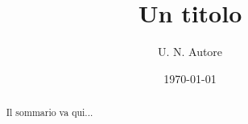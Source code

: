 \documentclass{article}
\title{Un titolo}
\author{U. N. Autore}
\date{\today}
\begin{document}
\maketitle

\begin{abstract}
Il sommario va qui...
\end{abstract}
\end{document}
